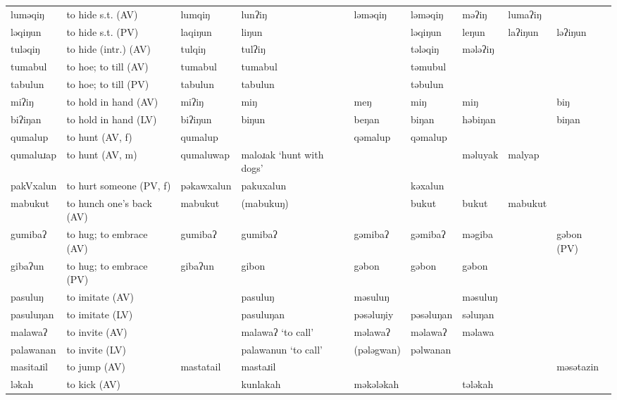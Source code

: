 \begin{landscape}
\begin{longtable}{*{9}{>{\raggedright\arraybackslash}p{}}}
\text{*}luməqiŋ      & to hide s.t. (AV) & lumqiŋ & lunʔiŋ & ləməqiŋ & ləməqiŋ & məʔiŋ & lumaʔiŋ & \\
\text{*}ləqiŋun      & to hide s.t. (PV) & laqiŋun & liŋun &  & ləqiŋun & leŋun & laʔiŋun & ləʔiŋun\\
\text{*}tuləqiŋ      & to hide (intr.) (AV) & tulqiŋ & tulʔiŋ &  & tələqiŋ & mələʔiŋ &  & \\
\text{*}tumabul      & to hoe; to till (AV) & tumabul & tumabul &  & təmubul &  &  & \\
\text{*}tabulun      & to hoe; to till (PV) & tabulun & tabulun &  & təbulun &  &  & \\
\text{*}miʔiŋ        & to hold in hand (AV) & miʔiŋ & miŋ & meŋ & miŋ & miŋ &  & biŋ\\
\text{*}biʔiŋan      & to hold in hand (LV) & biʔiŋun & biŋun & beŋan & biŋan & həbiŋan &  & biŋan\\
\text{*}qumalup      & to hunt (AV, f) & qumalup &  & qəmalup & qəmalup &  &  & \\
\text{*}qumaluɹap    & to hunt (AV, m) & qumaluwap & maloɹak `hunt with dogs' &  &  & məluyak & malyap & \\
\text{*}pakVxalun    & to hurt someone (PV, f) & pəkawxalun & pakuxalun &  & kəxalun &  &  & \\
\text{*}mabukut      & to hunch one's back (AV) & mabukut & (mabukuŋ) &  & bukut & bukut & mabukut & \\
\text{*}gumibaʔ      & to hug; to embrace (AV) & gumibaʔ & gumibaʔ & gəmibaʔ & gəmibaʔ & məgiba &  & gəbon (PV)\\
\text{*}gibaʔun      & to hug; to embrace (PV) & gibaʔun & gibon & gəbon & gəbon & gəbon &  & \\
\text{*}pasuluŋ      & to imitate (AV) &  & pasuluŋ & məsuluŋ &  & məsuluŋ &  & \\
\text{*}pasuluŋan    & to imitate (LV) &  & pasuluŋan & pəsəluŋiy & pəsəluŋan & səluŋan &  & \\
\text{*}malawaʔ      & to invite (AV) &  & malawaʔ \newline `to call' & məlawaʔ & məlawaʔ & məlawa &  & \\
\text{*}palawanan    & to invite (LV) &  & palawanun `to call' & (pələgwan) & pəlwanan &  &  & \\
\text{*}masitaɹil    & to jump (AV) & mastatail & mastaɹil &  &  &  &  & məsətazin\\
\text{*}ləkah       & to kick (AV) &  & kunlakah & məkələkah &  & tələkah &  & \\

\end{longtable}
\end{landscape}
